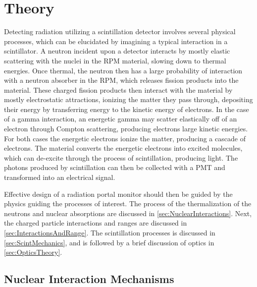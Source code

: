 \chapter{Theory}
\label{chap:theory}
Detecting radiation utilizing a scintillation detector involves several physical processes, which can be elucidated by imagining a typical interaction in a scintillator.
A neutron incident upon a detector interacts by mostly elastic scattering with the nuclei in the RPM material, slowing down to thermal energies.
Once thermal, the neutron then has a large probability of interaction with a neutron absorber in the RPM, which releases fission products into the material.
These charged fission products then interact with the material by mostly electrostatic attractions, ionizing the matter they pass through, depositing their energy by transferring  energy to the kinetic energy of electrons.
In the case of a gamma interaction, an energetic gamma may scatter elastically off of an electron through Compton scattering, producing electrons large kinetic energies.
For both cases the energetic electrons ionize the matter, producing a cascade of electrons.
The material converts the energetic electrons into excited molecules, which can de-excite through the process of scintillation, producing light.
The photons produced by scintillation can then be collected with a PMT and transformed into an electrical signal.

Effective design of a radiation portal monitor should then be guided by the physics guiding the processes of interest.
The process of the thermalization of the neutrons and nuclear absorptions are discussed in \autoref{sec:NuclearInteractions}.
Next, the charged particle interactions and ranges are discussed in \autoref{sec:InteractionsAndRange}.
The scintillation processes is discussed in \autoref{sec:ScintMechanics}, and is followed by a brief discussion of optics in \autoref{sec:OpticsTheory}.

 
\section{Nuclear Interaction Mechanisms}
\label{sec:NuclearInteractions}



